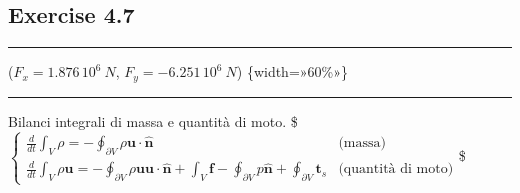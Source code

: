 \documentclass[letterpaper,10pt,italian]{jupyterBook}
\begin{document}
\sphinxstepscope


\subsection{Exercise 4.7}
\label{\detokenize{polimi/fluidmechanics-ita/template/capitoli/04_bilanci/0405in:exercise-4-7}}\label{\detokenize{polimi/fluidmechanics-ita/template/capitoli/04_bilanci/0405in:fluid-mechanics-balances-ex-07}}\label{\detokenize{polimi/fluidmechanics-ita/template/capitoli/04_bilanci/0405in::doc}}

\bigskip\hrule\bigskip


\sphinxAtStartPar
(\(F_x = 1.876\,10^6\ N\), \(F_y = -6.251\,10^6\ N\))   \{width=»60\%»\}


\bigskip\hrule\bigskip


\sphinxAtStartPar
Bilanci integrali di massa e quantità di moto. \$\(\begin{cases}
  \frac{d}{dt} \int_V \rho = -\oint_{\partial V} \rho \bm{u} \cdot \hat{\bm{n}}  & \text{(massa)} \\
  \frac{d}{dt} \int_V \rho \bm{u} = -\oint_{\partial V} \rho \bm{u} \bm{u} \cdot \hat{\bm{n}}
  +\int_V \bm{f} - \oint_{\partial V} p \hat{\bm{n}} + \oint_{\partial V} {\bm{t}_s} & \text{(quantità di moto)}
\end{cases}\)\$
\end{document}
